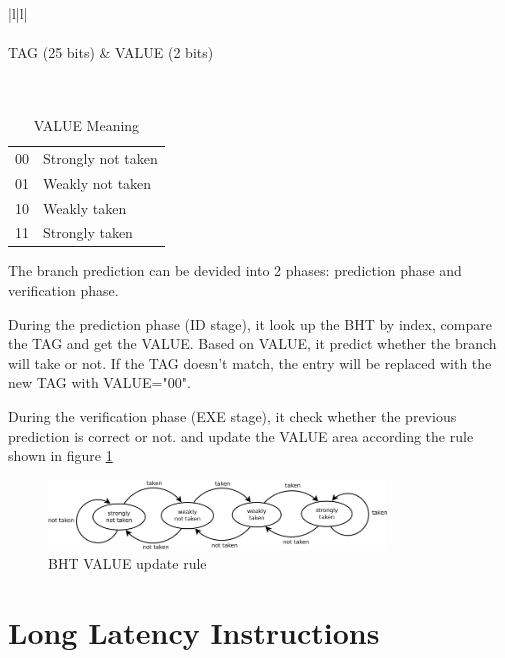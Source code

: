 \begin{table}[!ht]
\centering
\caption{BHT structure}
\label{tab:bpu_bht}
\begin{tabular}{|l|l|}
\hline
{}\\
\hline
{}\\
\hline
TAG (25 bits) & VALUE (2 bits) \\
\hline
{}\\
\hline
{}\\
\hline
\end{tabular}
\end{table}

\begin{table}[!ht]
\centering
\caption{VALUE Meaning}
\label{tab:bpu_value}
\begin{tabular}{|l|l|}
\hline
00 & Strongly not taken \\
01 & Weakly not taken \\
10 & Weakly taken \\
11 & Strongly taken \\
\hline
\end{tabular}
\end{table}

The branch prediction can be devided into 2 phases: prediction phase and verification phase.

During the prediction phase (ID stage), it look up the BHT by index, compare the TAG and get the VALUE.
Based on VALUE, it predict whether the branch will take or not. If the TAG doesn't match,
the entry will be replaced with the new TAG with VALUE="00".

During the verification phase (EXE stage), it check whether the previous prediction
is correct or not. and update the VALUE area according the rule shown in figure \ref{fig:bpu_rule}
\begin{figure}[Ht]
    \centering
    \includegraphics[width=0.8\textwidth]{fig/bpu_rule.png}
    \caption{BHT VALUE update rule}
    \label{fig:bpu_rule}
\end{figure}

\section[Long Latency Instructions]{Long Latency Instructions}
